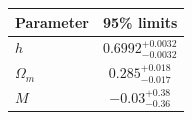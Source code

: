 \begin{tabular} { l  c}

 Parameter &  95\% limits\\
\hline
{\boldmath$h              $} & $0.6992^{+0.0032}_{-0.0032}$\\

{\boldmath$Ω_m            $} & $0.285^{+0.018}_{-0.017}   $\\

{\boldmath$M              $} & $-0.03^{+0.38}_{-0.36}     $\\
\hline
\end{tabular}